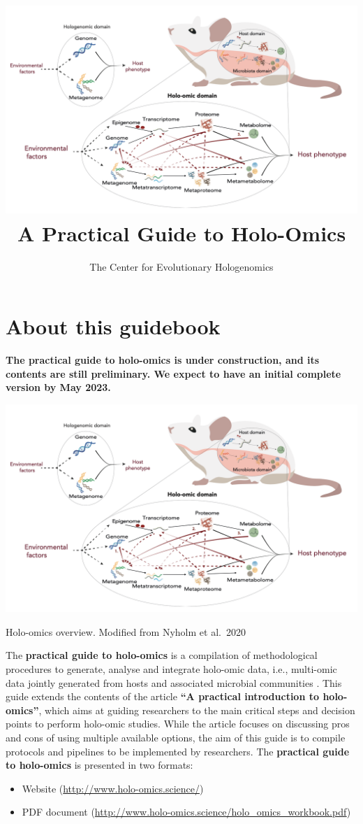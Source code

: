 \documentclass[
]{book}
\title{\includegraphics[width=1\textwidth,height=\textheight]{images/holo-omics_overview_nyholm.png}
A Practical Guide to Holo-Omics}
\author{The Center for Evolutionary Hologenomics}
\date{}
\providecommand{\tightlist}{%
  \setlength{\itemsep}{0pt}\setlength{\parskip}{0pt}}
\begin{document}
\maketitle

{
\setcounter{tocdepth}{1}
\tableofcontents
}
\hypertarget{about-this-guidebook}{%
\chapter*{About this guidebook}\label{about-this-guidebook}}

\textbf{The practical guide to holo-omics is under construction, and its contents are still preliminary. We expect to have an initial complete version by May 2023.}

\includegraphics{images/holo-omics_overview_nyholm.png}

Holo-omics overview. Modified from Nyholm et al.~2020 \citep{Nyholm2020-ua}

The \textbf{practical guide to holo-omics} is a compilation of methodological procedures to generate, analyse and integrate holo-omic data, i.e., multi-omic data jointly generated from hosts and associated microbial communities \citep{Nyholm2020-ua, Limborg2018-tf}. This guide extends the contents of the article \textbf{``A practical introduction to holo-omics''}, which aims at guiding researchers to the main critical steps and decision points to perform holo-omic studies. While the article focuses on discussing pros and cons of using multiple available options, the aim of this guide is to compile protocols and pipelines to be implemented by researchers. The \textbf{practical guide to holo-omics} is presented in two formats:

\begin{itemize}
\tightlist
\item
  Website (\url{http://www.holo-omics.science/})
\item
  PDF document (\url{http://www.holo-omics.science/holo_omics_workbook.pdf})
\end{itemize}
\end{document}
